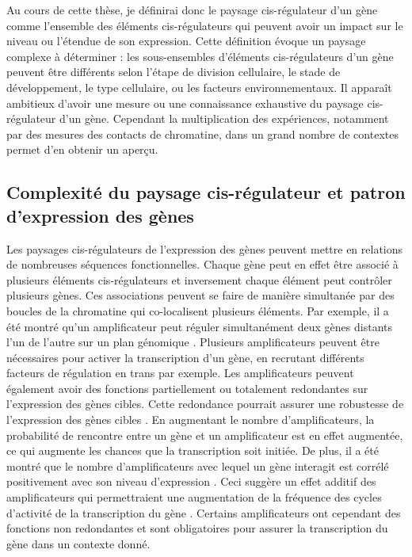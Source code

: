 Au cours de cette thèse, je définirai donc le paysage \gls{cis}-régulateur d’un gène comme l’ensemble des éléments \gls{cis}-régulateurs qui peuvent avoir un impact sur le niveau ou l’étendue de son expression. Cette définition évoque un paysage complexe à déterminer : les sous-ensembles d’éléments \gls{cis}-régulateurs d’un gène peuvent être différents selon l’étape de division cellulaire, le stade de développement, le type cellulaire, ou les facteurs environnementaux. Il apparaît ambitieux d’avoir une mesure ou une connaissance exhaustive du paysage \gls{cis}-régulateur d’un gène. Cependant la multiplication des expériences, notamment par des mesures des contacts de chromatine, dans un grand nombre de contextes permet d’en obtenir un aperçu.

\subsection{Complexité du paysage \gls{cis}-régulateur et patron d’expression des gènes}
\label{subsec:complexite}

Les paysages \gls{cis}-régulateurs de l’expression des gènes peuvent mettre en relations de nombreuses séquences fonctionnelles. Chaque gène peut en effet être associé à plusieurs éléments \gls{cis}-régulateurs et inversement chaque élément peut contrôler plusieurs gènes. Ces associations peuvent se faire de manière simultanée par des boucles de la chromatine qui co-localisent plusieurs éléments. Par exemple, il a été montré qu’un \gls{amplificateur} peut réguler simultanément deux gènes distants l’un de l’autre sur un plan génomique \citep{fukaya_enhancer_2016}. Plusieurs \glspl{amplificateur} peuvent être nécessaires pour activer la transcription d’un gène, en recrutant différents facteurs de régulation en trans par exemple. Les \glspl{amplificateur} peuvent également avoir des fonctions partiellement ou totalement redondantes sur l’expression des gènes cibles. Cette redondance pourrait assurer une robustesse de l’expression des gènes cibles \citep{berthelot_complexity_2018}. En augmentant le nombre d’\glspl{amplificateur}, la probabilité de rencontre entre un gène et un \gls{amplificateur} est en effet augmentée, ce qui augmente les chances que la transcription soit initiée. De plus, il a été montré que le nombre d’\glspl{amplificateur} avec lequel un gène interagit est corrélé positivement avec son niveau d’expression \citep{schoenfelder_pluripotent_2015, mifsud_mapping_2015, javierre_lineage-specific_2016, berthelot_complexity_2018}. Ceci suggère un effet additif des \glspl{amplificateur} qui permettraient une augmentation de la fréquence des cycles d’activité de la transcription du gène \citep{bartman_enhancer_2016}. Certains \glspl{amplificateur} ont cependant des fonctions non redondantes et sont obligatoires pour assurer la transcription du gène dans un contexte donné. \\

